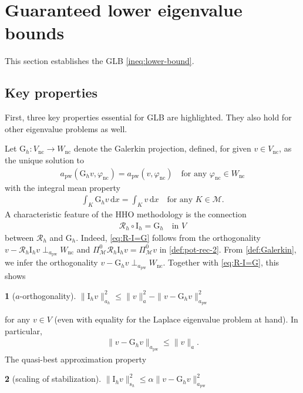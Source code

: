\documentclass[a4paper]{amsart}
\numberwithin{equation}{section}
\renewcommand{\d}[1]{\,\mathrm{d}#1}
\newcommand{\I}{\mathrm{I}}
\newcommand{\Mcal}{\mathcal{M}}
\newcommand{\s}{\mathrm{s}}
\newcommand{\pw}{\mathrm{pw}}
\theoremstyle{remark}
\theoremstyle{definition}
\theoremstyle{assumptionnoperiod}
\newtheorem{assumption}{}
\begin{document}
\section{Guaranteed lower eigenvalue bounds}\label{sec:leb}
This section establishes the GLB \eqref{ineq:lower-bound}.
\subsection{Key properties}\label{sec:main-results}
First, three key properties essential for GLB are highlighted. They also hold for other eigenvalue problems as well.

Let $\mathrm{G}_h : V_\mathrm{nc} \to W_\mathrm{nc}$ denote the Galerkin projection, defined, for given $v \in V_\mathrm{nc}$, as the unique solution to
\begin{align}\label{def:Galerkin}
	a_\pw(\mathrm{G}_h v, \varphi_\mathrm{nc}) = a_\pw(v, \varphi_\mathrm{nc}) \quad\text{for any } \varphi_\mathrm{nc} \in W_\mathrm{nc}
\end{align}
with the integral mean property
\begin{align}\label{eq:Galerkin_integral_mean}
	\int_K \mathrm{G}_h v \d{x} = \int_K v \d{x} \quad\text{for any } K \in \Mcal.
\end{align}
A characteristic feature of the HHO methodology is the connection
\begin{align}\label{eq:R-I=G}
	\mathcal{R}_h \circ \I_h = \mathrm{G}_h \quad\text{in } V
\end{align}
between $\mathcal{R}_h$ and $\mathrm{G}_h$. 
Indeed, \eqref{eq:R-I=G} follows from the orthogonality $v - \mathcal{R}_h \I_h v \perp_{a_\pw} W_\mathrm{nc}$ \cite[Eq.~(18)]{DiPietroErnLemaire2014} and $\Pi_{\mathcal{M}}^0 \mathcal{R}_h \I_h v = \Pi_{\mathcal{M}}^0 v$ in \eqref{def:pot-rec-2}.
From \eqref{def:Galerkin}, we infer the orthogonality $v - \mathrm{G}_h v \perp_{a_\pw} W_\mathrm{nc}$. Together with \eqref{eq:R-I=G}, this shows
\begin{assumption}[$a$-orthogonality]\label{A}
	$\|\I_h v\|_{a_h}^2 \leq \|v\|^2_a - \|v - \mathrm{G}_h v\|_{a_\pw}^2$
\end{assumption}
\noindent  for any $v \in V$ (even with equality for the Laplace eigenvalue problem at hand).
In particular,
\begin{align}\label{ineq:v-Gv<=v}
	\|v - \mathrm{G}_h v\|_{a_\pw} \leq \|v\|_a.
\end{align}
The quasi-best approximation property
\begin{assumption}[scaling of stabilization]\label{B}
	$\|\I_h v\|_{\s_h}^2 \leq \alpha \|v - \mathrm{G}_h v\|_{a_\pw}^2$
\end{assumption}
\end{document}

